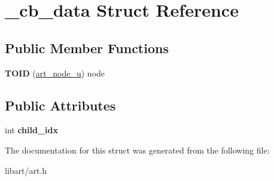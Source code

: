 \hypertarget{struct__cb__data}{}\section{\+\_\+cb\+\_\+data Struct Reference}
\label{struct__cb__data}
\subsection*{Public Member Functions}
\begin{DoxyCompactItemize}
\item 
\mbox{\label{struct__cb__data_a52c41acd51a4a1a8daea2fc414b603b0}} 
{\bfseries T\+O\+ID} (\hyperlink{struct__art__node__u}{art\+\_\+node\+\_\+u}) node
\end{DoxyCompactItemize}
\subsection*{Public Attributes}
\begin{DoxyCompactItemize}
\item 
\mbox{\label{struct__cb__data_a77ba76da523cea6b7be15af27db8488d}} 
int {\bfseries child\+\_\+idx}
\end{DoxyCompactItemize}


The documentation for this struct was generated from the following file\+:\begin{DoxyCompactItemize}
\item 
libart/art.\+h\end{DoxyCompactItemize}
